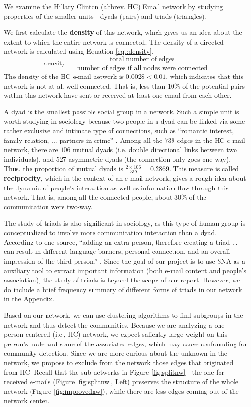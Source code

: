 We examine the Hillary Clinton (abbrev. HC) Email network by studying properties of the smaller units - dyads (pairs) and triads (triangles).   

We first calculate the {\bf density} of this network, which gives us an idea about the extent to which the entire network is connected. The density of a directed network is calculated using Equation \ref{eqt:density}.
\begin{equation}
\label{eqt:density}
\mbox{density }= \frac{\mbox{total number of edges}}{\mbox{number of edges if all nodes were connected}}
\end{equation}
The density of the HC e-mail network is $0.0028<0.01$, which indicates that this network is not at all well connected. That is, less than $10\%$ of the potential pairs within this network have sent or received at least one email from each other. 

A dyad is the smallest possible social group in a network. 
Such a simple unit is worth studying in sociology because two people in a dyad can be linked via some rather exclusive and intimate type of connections, such as ``romantic interest, family relation, ... partners in crime'' \cite{wiki_dyad}.
Among all the $739$ edges in the HC e-mail network, there are $106$ mutual dyads (i.e. double directional links between two individuals), and $527$ asymmetric dyads (the connection only goes one-way). 
Thus, the proportion of mutual dyads is $\frac{2 \times 106}{739}=0.2869$. 
This measure is called {\bf reciprocity}, which in the context of an e-mail network, gives a rough idea about the dynamic of people's interaction as well as information flow through this network. 
That is, among all the connected people, about $30\%$ of the communication were two-way. 

The study of triads is also significant in sociology, as this type of human group is conceptualized to involve more communication interaction than a dyad. According to one source,
``adding an extra person, therefore creating a triad ... can result in different language barriers, personal connection, and an overall impression of the third person.'' \cite{wiki_triad}.
Since the goal of our project is to use SNA as a auxiliary  tool to extract important information (both e-mail content and people's association), the study of triads is beyond the scope of our report. 
However, we do include a brief frequency summary of different forms of triads in our network in the Appendix.

Based on our network, we can use clustering algorithms to find subgroups in the network and thus detect the communities. 
Because we are analyzing a one-person-centered (i.e., HC) network, we expect saliently large weight on this person's node and some of the associated edges, which may cause confounding for community detection. 
Since we are more curious about the unknown in the network, we propose to exclude from the network those edges that originated from HC. Recall that the sub-networks in Figure \ref{fig:splitnw} - the one for received e-mails (Figure \ref{fig:splitnw}, Left) preserves the structure of the whole network (Figure \ref{fig:improvednw}), while there are less edges coming out of the network center.  

